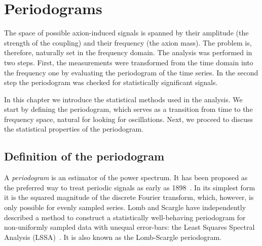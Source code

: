 \chapter{Periodograms}
\label{ch:axions-periodograms}
The space of possible axion-induced signals is spanned by their amplitude (the strength of the coupling) and their frequency (the axion mass). The problem is, therefore, naturally set in the frequency domain. The analysis was performed in two steps. First, the measurements were transformed from the time domain into the frequency one by evaluating the periodogram of the time series. In the second step the periodogram was checked for statistically significant signals.

In this chapter we introduce the statistical methods used in the analysis. We start by defining the periodogram, which serves as a transition from time to the frequency space, natural for looking for oscillations. Next, we proceed to discuss the statistical properties of the periodogram.




\section{Definition of the periodogram}
A \emph{periodogram} is an estimator of the power spectrum. It has been proposed as the preferred way to treat periodic signals as early as 1898~\cite{Schuster1898}. In its simplest form it is the squared magnitude of the discrete Fourier transform, which, however, is only possible for evenly sampled series. Lomb and Scargle have independently described a method to construct a statistically well-behaving periodogram for non-uniformly sampled data with unequal error-bars: the Least Squares Spectral Analysis (LSSA)~\cite{Scargle1982}. It is also known as the Lomb-Scargle periodogram.


